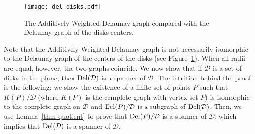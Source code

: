 \documentclass[pdftex,leqno,fleqn,12pt]{article}
\newcommand{\DEL}{{\rm{Del}}}
\begin{document}
\begin{figure}
\centering
\texttt{[image: del-disks.pdf]}
\caption{The Additively Weighted Delaunay graph compared with the Delaunay graph of the disks
centers.}\label{fig-del-disks}
\end{figure}

Note that the Additively Weighted Delaunay graph is not necessarily isomorphic
to the Delaunay graph of the centers of the disks (see
Figure~\ref{fig-del-disks}). When all radii are equal, however, the two graphs
coincide. We now show that if $\mathcal{D}$ is a set of disks in the plane,
then $\DEL(\mathcal{D})$ is a spanner of $\mathcal{D}$. The intuition behind
the proof is the following: we show the existence of a finite set of points $P$
such that $K(P)/\mathcal{D}$ (where $K(P)$ is the complete graph with vertex
set $P$) is isomorphic to the complete graph on $\mathcal{D}$ and
$\DEL(P)/\mathcal{D}$ is a subgraph of $\DEL(\mathcal{D})$. Then, we use
Lemma~\ref{thm-quotient} to prove that $\DEL(P)/\mathcal{D}$ is a spanner of
$\mathcal{D}$, which implies that $\DEL(\mathcal{D})$ is a spanner of
$\mathcal{D}$.
\end{document}
